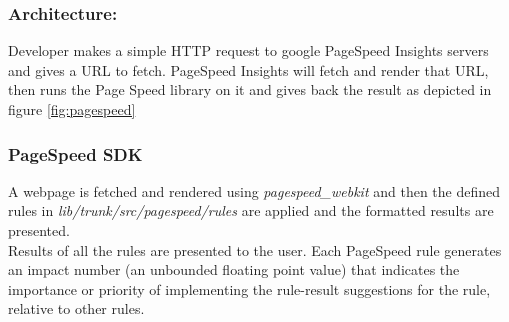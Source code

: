 \subsubsection{Architecture:}
Developer makes a simple HTTP request to google PageSpeed Insights servers and gives a URL to fetch. PageSpeed Insights will fetch and render that URL, then runs the Page Speed library on it and gives back the result as depicted in figure \ref{fig:pagespeed}
\begin{figure}[!htb]
\end{figure}

\subsubsection {PageSpeed SDK}
A webpage is fetched and rendered using {\em pagespeed\_webkit} and then the defined rules  in {\em lib/trunk/src/pagespeed/rules} are applied and the formatted results are presented.\\
Results of all the rules are presented to the user. Each PageSpeed rule generates an impact number (an unbounded floating point value) that indicates the importance or priority of implementing the rule-result suggestions for the rule, relative to other rules.\\

